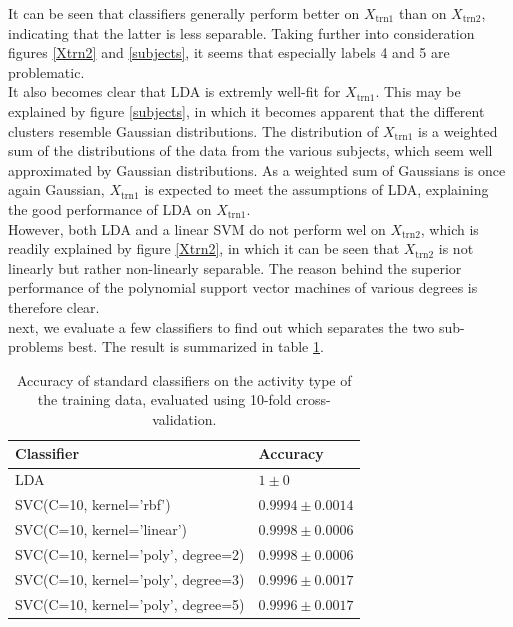 \documentclass [a4paper] {report}
\begin{document}
	\noindent
	It can be seen that classifiers generally perform better on $X_{\text{trn1}}$ than on $X_{\text{trn2}}$, indicating that the latter is less separable. Taking further into consideration figures \ref{Xtrn2} and \ref{subjects}, it seems that especially labels 4 and 5 are problematic. \\
	It also becomes clear that LDA is extremly well-fit for $X_{\text{trn1}}$. This may be explained by figure \ref{subjects}, in which it becomes apparent that the different clusters resemble Gaussian distributions. The distribution of $X_{\text{trn1}}$ is a weighted sum of the distributions of the data from the various subjects, which seem well approximated by Gaussian distributions. As a weighted sum of Gaussians is once again Gaussian, $X_{\text{trn1}}$ is expected to meet the assumptions of LDA, explaining the good performance of LDA on $X_{\text{trn1}}$. \\
	However, both LDA and a linear SVM do not perform wel on $X_{\text{trn2}}$, which is readily explained by figure \ref{Xtrn2}, in which it can be seen that $X_{\text{trn2}}$ is not linearly but rather non-linearly separable. The reason behind the superior performance of the polynomial support vector machines of various degrees is therefore clear.\\
	
	\noindent
	next, we evaluate a few classifiers to find out which separates the two sub-problems best. The result is summarized in table \ref{tab:separator}.
	
	\begin{table}[H]
		\centering
		\caption{Accuracy of standard classifiers on the activity type of the training data, evaluated using 10-fold cross-validation.}
		\label{tab:separator}
		\begin{tabular}{l|l}
			Classifier 							& Accuracy  \\ \hline
			LDA 								& $1 \pm 0 $\\
			SVC(C=10, kernel='rbf') 			& $0.9994 \pm 0.0014 $\\
			SVC(C=10, kernel='linear') 			& $0.9998 \pm 0.0006 $\\
			SVC(C=10, kernel='poly', degree=2) 	& $0.9998 \pm 0.0006 $\\
			SVC(C=10, kernel='poly', degree=3) 	& $0.9996 \pm 0.0017 $\\
			SVC(C=10, kernel='poly', degree=5) 	& $0.9996 \pm 0.0017 $\\
		\end{tabular}		
	\end{table}
	
\end{document}
